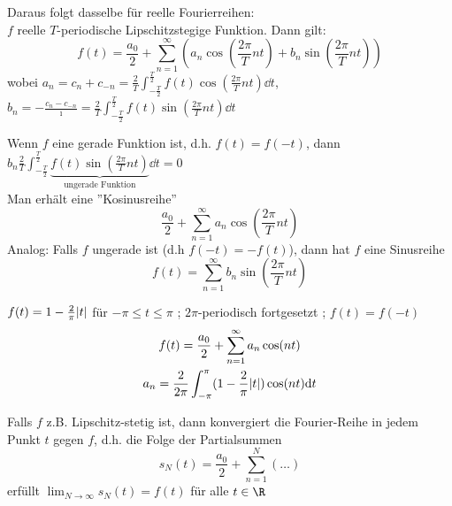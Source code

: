 Daraus folgt dasselbe für reelle Fourierreihen: \\
$f$ reelle $T$-periodische Lipschitzstegige Funktion. Dann gilt:
\[ f(t) = \frac{a_0}{2} + \sum_{n=1}^\infty \left( a_n \cos\left( \frac{2\pi}{T} nt \right) + b_n \sin\left( \frac{2\pi}{T} nt \right) \right) \]
wobei $a_n = c_n + c_{-n} = \frac{2}{T} \int_{-\frac{T}{2}}^{\frac{T}{2}} f(t) \cos\left( \frac{2\pi}{T} nt \right) \dd t$, $b_n = -\frac{c_n - c_{-n}}{\imath} = \frac{2}{T} \int_{-\frac{T}{2}}^{\frac{T}{2}} f(t) \sin\left( \frac{2\pi}{T} nt \right) \dd t$ \\
\begin{bem}
	Wenn $f$ eine gerade Funktion ist, d.h. $f(t) = f(-t)$, dann $b_n \frac{2}{T} \int_{-\frac{T}{2}}^{\frac{T}{2}} \underbrace{f(t) \sin\left( \frac{2\pi}{T} nt \right)}_{\text{ungerade Funktion}} \dd t = 0$ \\
	Man erhält eine ''Kosinusreihe''
	\[ \frac{a_0}{2} + \sum_{n=1}^\infty a_n \cos\left( \frac{2\pi}{T} nt \right) \]
	Analog: Falls $f$ ungerade ist (d.h $f(-t) = -f(t)$), dann hat $f$ eine Sinusreihe
	\[ f(t) = \sum_{n=1}^\infty b_n \sin\left( \frac{2\pi}{T} nt \right) \]
\end{bem}
\begin{bsp*}
	$f(t) = 1 - \frac{2}{\pi} \abs{t}$ für $-\pi \leq t \leq \pi$ ; $2\pi$-periodisch fortgesetzt ; $f(t) = f(-t)$
	\begin{gather*}
		f(t) = \frac{a_0}{2} + \sum_{n=1}^\infty a_n \cos( nt ) \\
		a_n = \frac{2}{2\pi} \int_{-\pi}^{\pi} ( 1 - \frac{2}{\pi} \abs{t} ) \cos( nt ) \dd t
	\end{gather*}
\end{bsp*}

Falls $f$ z.B. Lipschitz-stetig ist, dann konvergiert die Fourier-Reihe in jedem Punkt $t$ gegen $f$, d.h. die Folge der Partialsummen
\[ s_N(t) = \frac{a_0}{2} + \sum_{n=1}^N ( \dots ) \]
erfüllt $\lim_{N \rightarrow \infty} s_N(t) = f(t)$ für alle $t \in \R$

